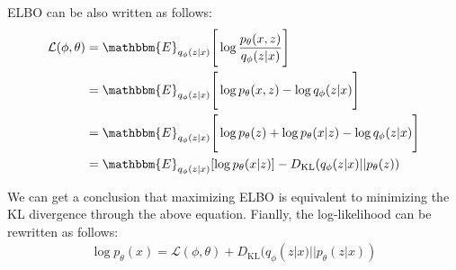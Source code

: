 ELBO can be also written as follows:
\begin{align*}
\mathcal{L}(\phi,\theta) & = \mathbbm{E}_{q_{\phi}(z|x)}\Bigg[\log \frac{p_{\theta}(x,z)}{q_{\phi}(z|x) }\Bigg]\\
& = \mathbbm{E}_{q_{\phi}(z|x)}\Bigg[\log p_{\theta}(x,z)-\log q_{\phi}(z|x)\Bigg]\\
& = \mathbbm{E}_{q_{\phi}(z|x)}\Bigg[\log p_{\theta}(z)+\log p_{\theta}(x|z)-\log q_{\phi}(z|x)\Bigg]\\
& = \mathbbm{E}_{q_{\phi}(z|x)}[\log p_{\theta}(x|z)] - D_{\textrm{KL}}(q_{\phi}(z|x)||p_{\theta}(z))\\
\end{align*}

We can get a conclusion that maximizing ELBO is equivalent to minimizing the KL divergence through the above equation. Fianlly, the log-likelihood can be rewritten as follows:
\begin{align*}
	\log p_{\theta}(x) = \mathcal{L}(\phi,\theta) + D_{\textrm{KL}}(q_{\phi}(z|x)||p_{\theta}(z|x))
\end{align*}



